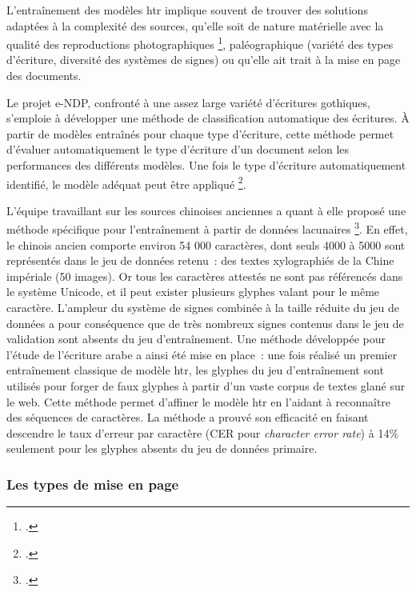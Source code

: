 \documentclass[a4paper,12pt,twoside]{book}
\begin{document}
				L'entraînement des modèles \gls{htr} implique souvent de trouver des solutions
				adaptées à la complexité des sources, qu'elle soit de nature matérielle
				avec la qualité des reproductions photographiques
				\footcite{leblancTranskribusEScriptoriumRetour2022}, 
				paléographique (variété des types d'écriture, diversité des systèmes de signes) ou qu'elle ait trait à la mise en page des documents.
				
				Le projet e-NDP, confronté à une assez large variété d'écritures
				gothiques, s'emploie à développer une méthode de classification
				automatique des écritures. À partir de modèles entraînés pour chaque
				type d'écriture, cette méthode permet d'évaluer automatiquement le type
				d'écriture d'un document selon les performances des différents modèles.
				Une fois le type d'écriture automatiquement identifié, le modèle adéquat
				peut être appliqué
				\footcite{torresaguilarModelisationAffinageHTR2022}.
				
				L'équipe travaillant sur les sources chinoises anciennes a quant à elle
				proposé une méthode spécifique pour l'entraînement à partir de données
				lacunaires
				\footcite{bizais-lilligExperimentationsPourAnalyse2022}.
				En effet, le chinois ancien comporte environ 54 000 caractères, dont seuls 4000 à
				5000 sont représentés dans le jeu de données retenu~: des textes
				xylographiés de la Chine impériale (50 images). Or tous les caractères
				attestés ne sont pas référencés dans le système Unicode, et il peut
				exister plusieurs glyphes valant pour le même caractère. L'ampleur du
				système de signes combinée à la taille réduite du jeu de données a pour
				conséquence que de très nombreux signes contenus dans le jeu de
				validation sont absents du jeu d'entraînement. Une méthode développée
				pour l'étude de l'écriture arabe a ainsi été mise en place~: une fois
				réalisé un premier entraînement classique de modèle \gls{htr}, les glyphes du
				jeu d'entraînement sont utilisés pour forger de faux glyphes à partir
				d'un vaste corpus de textes glané sur le web. Cette méthode permet
				d'affiner le modèle \gls{htr} en l'aidant à reconnaître des séquences de
				caractères. La méthode a prouvé son efficacité en faisant descendre le
				taux d'erreur par caractère (CER pour \textit{character error rate}) à
				14\% seulement pour les glyphes absents du jeu de données primaire.
				
				\subsubsection{Les types de mise en page}
				
\end{document}
